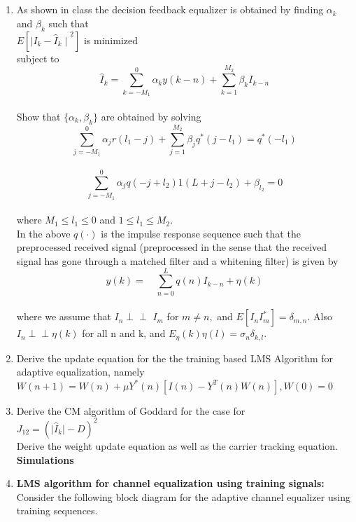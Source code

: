 \documentclass[journal,12pt,twocolumn]{IEEEtran}
\begin{document}
\section{}
\begin{enumerate}
\item As shown in class the decision feedback equalizer is obtained by finding $\alpha_k $ and $ \beta_k$ such that\\
$E[{\mid{I_k}-{\hat{I}_k}\mid}^2]$ is minimized\\
\bigskip
subject to
$${\hat{I}}_k=\sum_{k={-M_1}}^0{\alpha_k}y(k-n)+\sum_{k=1}^{M_2}{\beta_k}{I_{k-n}}$$\\
\bigskip
Show that $\{\alpha_k,\beta_k\}$ are obtained by solving\\
\medskip
$$\sum_{j=-{M_1}}^{0}{\alpha_j}r(l_1-j)+\sum_{j=1}^{M_2}{\beta_j}q^*(j-l_1)=q^*(-l_1)$$\\
\bigskip
$$\sum_{j=-{M_1}}^{0}{\alpha_j}q(-j+l_2)1(L+j-l_2)+\beta_{l_2}=0$$\\
\bigskip
where $M_1\leq {l_1}\leq 0$ and $1\leq{l_1}\leq M_2.$\\
In the above $q(\cdot)$ is the impulse response sequence such that the preprocessed received signal (preprocessed in the
sense that the received signal has gone through a matched filter and a whitening filter) is given by\\
\medskip
$$y(k)= \quad\sum_{n=0}^{L}q(n)I_{k-n}+\eta(k)$$\\
\bigskip
where we assume that $I_n \perp\!\!\!\perp $ $I_m$ for $m \neq n,$ and $E[I_nI_m^{*}]=\delta_{m,n}.$ Also $I_n \perp\!\!\!\perp \eta(k)$ for all n and k, and $E_\eta(k)\eta(l)=\sigma_n\delta_{k,l}.$   
\medskip
\item Derive the update equation for the the training based LMS Algorithm for adaptive equalization, namely\\
\bigskip
$W(n+1)=W(n)+\mu {Y^*(n)}[I(n)-Y^T(n)W(n)],W(0)=0$\\
\medskip
\item Derive the CM algorithm of Goddard for the case for\\
\medskip
$J_{12}={(\vert\hat{I}_k\vert -D)}^2$\\
Derive the weight update equation as well as the carrier tracking equation.\\
\textbf{Simulations}
\item \textbf{LMS algorithm for channel equalization using training signals:}\\
Consider the following block diagram for the adaptive channel equalizer using training sequences.\\

\end{enumerate}
\end{document}

